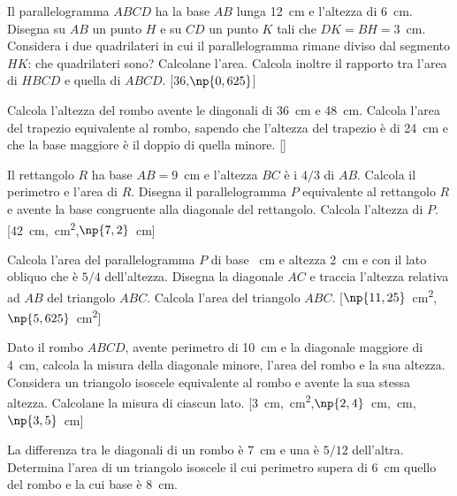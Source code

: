\begin{multicols}{2}
\begin{esercizio}
\label{ese:7.46}
Il parallelogramma $ABCD$ ha la base $AB$ lunga 12~cm e l'altezza di 
6~cm. Disegna su $AB$ un punto $H$ e su $CD$ un punto $K$ tali che 
$DK=BH=3$~cm. Considera i due quadrilateri in cui il parallelogramma 
rimane diviso dal segmento $HK$: che quadrilateri sono? Calcolane 
l'area. Calcola inoltre il rapporto tra l'area di $HBCD$ e quella di 
$ABCD$.
\hfill[36,\quad $\np{0,625}$]
\end{esercizio}

\begin{esercizio}
\label{ese:7.47}
Calcola l'altezza del rombo avente le diagonali di 36~cm e 48~cm. 
Calcola l'area del trapezio equivalente al rombo, sapendo che 
l'altezza del trapezio è di 24~cm e che la base maggiore è il doppio 
di quella minore.
\hfill[]
\end{esercizio}

\begin{esercizio}
\label{ese:7.48}
Il rettangolo $R$ ha base $AB = 9$~cm e l'altezza $BC$ è i $4/3$ di 
$AB$. Calcola il perimetro e l'area di $R$. Disegna il 
parallelogramma $P$ equivalente al rettangolo $R$ e avente la base 
congruente alla diagonale del rettangolo. Calcola l'altezza di $P$.
\hfill[42~cm,~cm\textsuperscript{2},\quad $\np{7,2}$~cm]
\end{esercizio}

\begin{esercizio}
\label{ese:7.49}
Calcola l'area del parallelogramma $P$ di base ~cm e altezza 
2~cm e con il lato obliquo che è $5/4$ dell'altezza. Disegna la 
diagonale $AC$ e traccia l'altezza relativa ad $AB$ del triangolo 
$ABC$. Calcola l'area del triangolo $ABC$.
\hfill[$\np{11,25}$~cm\textsuperscript{2},\quad 
$\np{5,625}$~cm\textsuperscript{2}]
\end{esercizio}

\begin{esercizio}
\label{ese:7.51}
Dato il rombo $ABCD$, avente perimetro di 10~cm e la diagonale 
maggiore di 4~cm, calcola la misura della diagonale minore, l'area 
del rombo e la sua altezza. Considera un triangolo isoscele 
equivalente al rombo e avente la sua stessa altezza. Calcolane la 
misura di ciascun lato.
\hfill[3~cm,~cm\textsuperscript{2},\quad $\np{2,4}$~cm,~cm,\quad $\np{3,5}$~cm]
\end{esercizio}

\begin{esercizio}
\label{ese:7.58}
La differenza tra le diagonali di un rombo è 7~cm e una è $5/12$ 
dell'altra. Determina l'area di un triangolo isoscele il cui 
perimetro supera di 6~cm quello del rombo e la cui base è 8~cm.
\end{esercizio}


\end{multicols}
